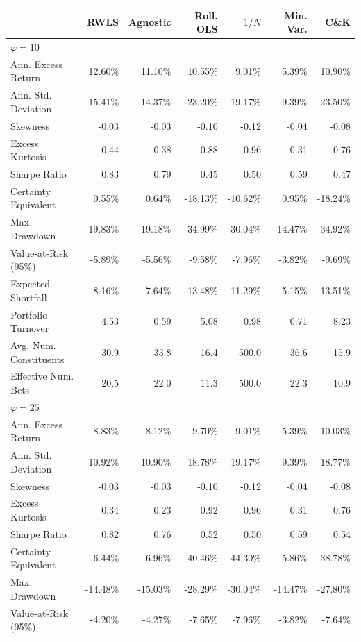 \begin{tabular*}{\textwidth}{l@{\extracolsep{\fill}}rrrrrr}
\toprule
 & RWLS & Agnostic & Roll. OLS & $1/N$ & Min. Var. & C\&K \\
\midrule
\multicolumn{7}{l}{\textit{$\varphi = 10$}} \\
\midrule
Ann. Excess Return & 12.60\% & 11.10\% & 10.55\% & 9.01\% & 5.39\% & 10.90\% \\
Ann. Std. Deviation & 15.41\% & 14.37\% & 23.20\% & 19.17\% & 9.39\% & 23.50\% \\
Skewness & -0.03 & -0.03 & -0.10 & -0.12 & -0.04 & -0.08 \\
Excess Kurtosis & 0.44 & 0.38 & 0.88 & 0.96 & 0.31 & 0.76 \\
Sharpe Ratio & 0.83 & 0.79 & 0.45 & 0.50 & 0.59 & 0.47 \\
Certainty Equivalent & 0.55\% & 0.64\% & -18.13\% & -10.62\% & 0.95\% & -18.24\% \\
Max. Drawdown & -19.83\% & -19.18\% & -34.99\% & -30.04\% & -14.47\% & -34.92\% \\
Value-at-Risk (95\%) & -5.89\% & -5.56\% & -9.58\% & -7.96\% & -3.82\% & -9.69\% \\
Expected Shortfall & -8.16\% & -7.64\% & -13.48\% & -11.29\% & -5.15\% & -13.51\% \\
Portfolio Turnover & 4.53 & 0.59 & 5.08 & 0.98 & 0.71 & 8.23 \\
Avg. Num. Constituents & 30.9 & 33.8 & 16.4 & 500.0 & 36.6 & 15.9 \\
Effective Num. Bets & 20.5 & 22.0 & 11.3 & 500.0 & 22.3 & 10.9 \\
\midrule
\multicolumn{7}{l}{\textit{$\varphi = 25$}} \\
\midrule
Ann. Excess Return & 8.83\% & 8.12\% & 9.70\% & 9.01\% & 5.39\% & 10.03\% \\
Ann. Std. Deviation & 10.92\% & 10.90\% & 18.78\% & 19.17\% & 9.39\% & 18.77\% \\
Skewness & -0.03 & -0.03 & -0.10 & -0.12 & -0.04 & -0.08 \\
Excess Kurtosis & 0.34 & 0.23 & 0.92 & 0.96 & 0.31 & 0.76 \\
Sharpe Ratio & 0.82 & 0.76 & 0.52 & 0.50 & 0.59 & 0.54 \\
Certainty Equivalent & -6.44\% & -6.96\% & -40.46\% & -44.30\% & -5.86\% & -38.78\% \\
Max. Drawdown & -14.48\% & -15.03\% & -28.29\% & -30.04\% & -14.47\% & -27.80\% \\
Value-at-Risk (95\%) & -4.20\% & -4.27\% & -7.65\% & -7.96\% & -3.82\% & -7.64\% \\

\end{tabular*}
